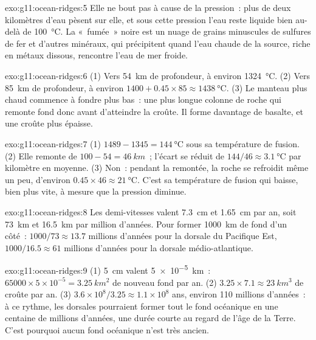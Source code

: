 \begin{solution}{exo:g11:ocean-ridges:5}
Elle ne bout pas à cause de la pression~: plus de deux kilomètres d'eau
pèsent sur elle, et sous cette pression l'eau reste liquide bien au-delà de
\qty{100}{\celsius}. La «~fumée~» noire est un nuage de grains minuscules
de sulfures de fer et d'autres minéraux, qui précipitent quand l'eau chaude
de la source, riche en métaux dissous, rencontre l'eau de mer froide.
\end{solution}

\begin{solution}{exo:g11:ocean-ridges:6}
(1) Vers \qty{54}{km} de profondeur, à environ \qty{1324}{\celsius}.
(2) Vers \qty{85}{km} de profondeur, à environ $1400 + 0.45 \times 85 \approx
\qty{1438}{\celsius}$. (3) Le manteau plus chaud commence à fondre plus
bas~: une plus longue colonne de roche qui remonte fond donc avant
d'atteindre la croûte. Il forme davantage de basalte, et une croûte plus
épaisse.
\end{solution}

\begin{solution}{exo:g11:ocean-ridges:7}
(1) $1489 - 1345 = \qty{144}{\celsius}$ sous sa température de fusion.
(2) Elle remonte de $100 - 54 = \qty{46}{km}$~; l'écart se réduit de
$144/46 \approx \qty{3.1}{\celsius}$ par kilomètre en moyenne. (3) Non~:
pendant la remontée, la roche se refroidit même un peu, d'environ
$0.45 \times 46 \approx
\qty{21}{\celsius}$. C'est sa température de fusion qui baisse, bien plus
vite, à mesure que la pression diminue.
\end{solution}

\begin{solution}{exo:g11:ocean-ridges:8}
Les demi-vitesses valent \qty{7.3}{cm} et \qty{1.65}{cm} par an, soit
\qty{73}{km} et \qty{16.5}{km} par million d'années. Pour former
\qty{1000}{km} de fond d'un côté~: $1000/73 \approx 13.7$ millions d'années
pour la dorsale du Pacifique Est, $1000/16.5 \approx 61$ millions d'années
pour la dorsale médio-atlantique.
\end{solution}

\begin{solution}{exo:g11:ocean-ridges:9}
(1) \qty{5}{cm} valent \qty{5e-5}{km}~: $65000 \times 5 \times 10^{-5} =
\qty{3.25}{km^2}$ de nouveau fond par an. (2) $3.25 \times 7.1 \approx
\qty{23}{km^3}$ de croûte par an. (3) $3.6 \times 10^8 / 3.25 \approx 1.1
\times 10^8$ ans, environ 110 millions d'années~: à ce rythme, les dorsales
pourraient former tout le fond océanique en une centaine de millions
d'années, une durée courte au regard de l'âge de la Terre. C'est pourquoi
aucun fond océanique n'est très ancien.
\end{solution}

